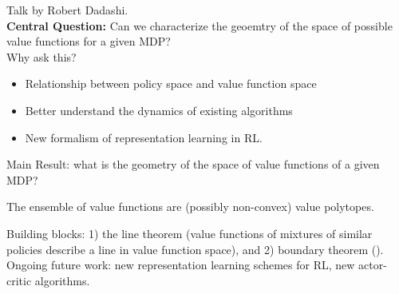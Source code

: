Talk by Robert Dadashi. \\

{\bf Central Question:} Can we characterize the geoemtry of the space of possible value functions for a given MDP? \\

Why ask this?
\begin{itemize}
    \item Relationship between policy space and value function space
    \item Better understand the dynamics of existing algorithms
    \item New formalism of representation learning in RL.
\end{itemize}

Main Result: what is the geometry of the space of value functions of a given MDP?
\begin{theorem}
The ensemble of value functions are (possibly non-convex) value polytopes.
\end{theorem}

Building blocks: 1) the line theorem (value functions of mixtures of similar policies describe a line in value function space), and 2) boundary theorem ().\\

Ongoing future work: new representation learning schemes for RL, new actor-critic algorithms. \\

